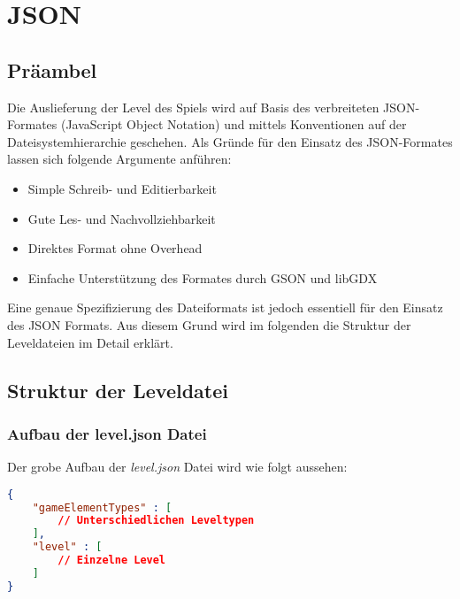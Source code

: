 \clearpage

\section{JSON}

\subsection{Präambel}

Die Auslieferung der Level des Spiels wird auf Basis des verbreiteten JSON-Formates (JavaScript Object Notation) und mittels Konventionen auf der Dateisystemhierarchie geschehen. Als Gründe für den Einsatz des JSON-Formates lassen sich folgende Argumente anführen:

\begin{itemize}
	\item Simple Schreib- und Editierbarkeit
	\item Gute Les- und Nachvollziehbarkeit
	\item Direktes Format ohne Overhead
	\item Einfache Unterstützung des Formates durch GSON und libGDX
\end{itemize}

Eine genaue Spezifizierung des Dateiformats ist jedoch essentiell für den Einsatz des JSON Formats. Aus diesem Grund wird im folgenden die Struktur der Leveldateien im Detail erklärt.

\subsection{Struktur der Leveldatei}

\begin{minipage}{1\textwidth}

\subsubsection{Aufbau der level.json Datei}

Der grobe Aufbau der \textit{level.json} Datei wird wie folgt aussehen:

\begin{lstlisting}[language=json, firstnumber=1]
{
	"gameElementTypes" : [
		// Unterschiedlichen Leveltypen
	],
	"level" : [
		// Einzelne Level
	]
}
\end{lstlisting}

\end{minipage}


